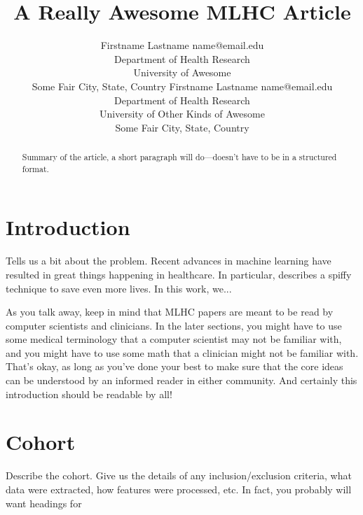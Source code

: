 \documentclass[twoside,11pt]{article}
\begin{document}
\title{A Really Awesome MLHC Article}

\author{\name Firstname Lastname \email name@email.edu \\
       \addr Department of Health Research\\
       University of Awesome\\
       Some Fair City, State, Country 
       \AND
       \name Firstname Lastname \email name@email.edu \\
       \addr Department of Health Research\\
       University of Other Kinds of Awesome\\
       Some Fair City, State, Country} 

\maketitle

\begin{abstract}
  Summary of the article, a short paragraph will do---doesn't have to
  be in a structured format.  
\end{abstract}

\section{Introduction}

Tells us a bit about the problem.  Recent advances in machine learning
\citep{cite1} have resulted in great things happening in healthcare.
In particular, \citet{cite2} describes a spiffy technique to save even
more lives.  In this work, we...

As you talk away, keep in mind that MLHC papers are meant to be read
by computer scientists and clinicians.  In the later sections, you
might have to use some medical terminology that a computer scientist
may not be familiar with, and you might have to use some math that a
clinician might not be familiar with.  That's okay, as long as you've
done your best to make sure that the core ideas can be understood by
an informed reader in either community.  And certainly this
introduction should be readable by all! 

\section{Cohort}

Describe the cohort.  Give us the details of any inclusion/exclusion
criteria, what data were extracted, how features were processed,
etc. In fact, you probably will want headings for
\end{document}
